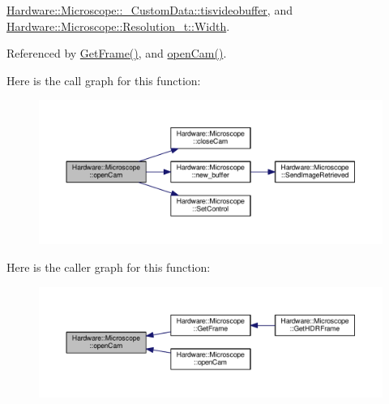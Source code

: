 \hyperlink{_microscope_8h_source_l00110}{Hardware\+::\+Microscope\+::\+\_\+\+Custom\+Data\+::tisvideobuffer}, and \hyperlink{_microscope_8h_source_l00058}{Hardware\+::\+Microscope\+::\+Resolution\+\_\+t\+::\+Width}.



Referenced by \hyperlink{_microscope_8cpp_source_l00319}{Get\+Frame()}, and \hyperlink{_microscope_8cpp_source_l00289}{open\+Cam()}.



Here is the call graph for this function\+:
\nopagebreak
\begin{figure}[H]
\begin{center}
\leavevmode
\includegraphics[width=350pt]{class_hardware_1_1_microscope_a71ac92fc7c1cc19c7735a9c0b93b1eef_cgraph}
\end{center}
\end{figure}




Here is the caller graph for this function\+:
\nopagebreak
\begin{figure}[H]
\begin{center}
\leavevmode
\includegraphics[width=350pt]{class_hardware_1_1_microscope_a71ac92fc7c1cc19c7735a9c0b93b1eef_icgraph}
\end{center}
\end{figure}


\hypertarget{class_hardware_1_1_microscope_a7298405c4115400b8d949703b0bcad0c}{}
